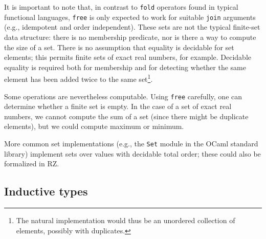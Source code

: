 It is important to note that, in contrast to \texttt{fold} operators found in typical functional
languages, \texttt{free} is only expected to work for suitable \texttt{join} arguments (e.g., idempotent and order independent).  These
sets are not the typical finite-set data structure: there is no membership predicate, nor
is there a way to compute the size of a set.  There is no
assumption that equality is decidable for set elements; this permits
finite sets of  exact real numbers, for example.  Decidable equality
is required both for membership and for detecting
whether the same element has been added twice to the same set\footnote{The natural implementation would thus
be an unordered collection of elements, possibly with duplicates.}.

Some operations are nevertheless computable.  Using \texttt{free} carefully, one
can determine whether a finite set is empty.  In the case of a set of exact
real numbers, we cannot compute the sum of a set (since there might
be duplicate elements), but we could compute maximum or minimum.

More common set implementations (e.g., the \texttt{Set} module in the OCaml standard library)
implement sets over values with decidable total order; these could also be
formalized in RZ.
\fi %

\subsection{Inductive types}
\label{sec:inductive-types}

